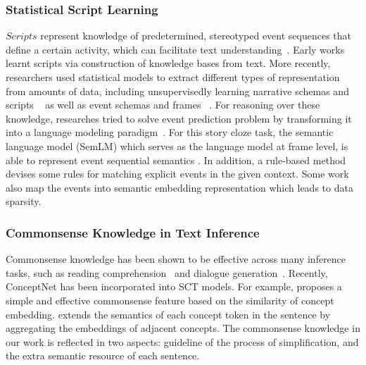 \subsubsection*{Statistical Script Learning}
$Scripts$ represent knowledge of predetermined, stereotyped event sequences that define a certain activity, 
which can facilitate text understanding~\cite{regneri2011learning}.
Early works~\cite{schank2013scripts} learnt scripts 
via construction of knowledge bases from text. 
More recently, researchers used statistical models to extract different types 
of representation from amounts of data, including unsupervisedly learning 
narrative schemas and scripts
~\cite{regneri2011learning} as well as event schemas and frames 
~\cite{sha2016joint,huang2016liberal}.
For reasoning over these knowledge, researches tried to solve event
 prediction problem by transforming it into a language modeling 
 paradigm~\cite{rudinger2015script,hu2017happens}.
For this story cloze task, the semantic language model (SemLM)
which serves as the language model at frame level,
is able to represent event sequential semantics
\cite{li2018mult}. In addition, a rule-based 
method~\cite{lin2017reasoning} devises some rules for matching 
explicit events in the given context. Some work\cite{modi2016event} also
map the events into semantic embedding representation which leads to 
data sparsity.

\subsubsection*{Commonsense Knowledge in Text Inference}
Commonsense knowledge has been shown to be effective across many
inference tasks,
such as reading comprehension~\cite{mihaylov2018knowledgeable}
and dialogue generation~\cite{liu2018knowledge}.
Recently, ConceptNet has been incorporated into SCT models.
For example, \cite{chen2018incorporating} proposes a simple and
effective commonsense feature based on the similarity of concept embedding.
\cite{guan2018story} extends the semantics of each concept token
in the sentence by aggregating the embeddings of adjacent concepts.
The commonsense knowledge in our work is reflected in two aspects:
guideline of the process of simplification,
and the extra semantic resource of each sentence.

